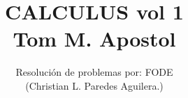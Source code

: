 \normalfont

\author{\Large Resolución de problemas por: FODE \\ \small (Christian L. Paredes Aguilera.)}
\title{CALCULUS vol 1\\ \small Tom M. Apostol}
\date{}
\pagestyle{empty}
\maketitle
\thispagestyle{empty}
\let\cleardoublepage\clearpage
\tableofcontents								%


 
\let\cleardoublepage\clearpage
